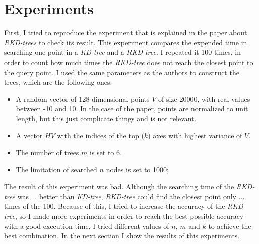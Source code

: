\section{Experiments}

First, I tried to reproduce the experiment that is explained in the paper about \textit{RKD-trees} to check its result. This experiment compares the  expended time in searching one point in a \textit{KD-tree} and a \textit{RKD-tree}. I repeated it 100 times, in order to count how much times the \textit{RKD-tree} does not reach the closest point to the query point. I used the same parameters as the authors to construct the trees, which are the following ones:
\begin{itemize}
    \item A random vector of 128-dimensional points $V$ of size 20000, with real values between -10 and 10. In the case of the paper, points are normalized to unit length, but this just complicate things and is not relevant.
    \item A vector $HV$ with the indices of the top ($k$) axes with highest variance of $V$.
    \item The number of trees $m$ is set to 6.
    \item The limitation of searched $n$ nodes is set to 1000;
\end{itemize}

The result of this experiment was bad. Although the searching time of the \textit{RKD-tree} was ... better than \textit{KD-tree}, \textit{RKD-tree} could find the closest point only ... times of the 100. Because of this, I tried to increase the accuracy of the \textit{RKD-tree}, so I made more experiments in order to reach the best possible accuracy with a good execution time. I tried different values of $n$, $m$ and $k$ to achieve the best combination. In the next section I show the results of this experiments.

